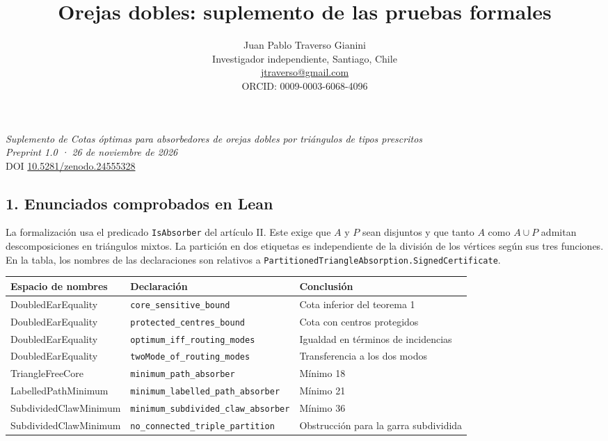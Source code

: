 \documentclass[spanish,11pt,a4paper]{article}
\title{Orejas dobles: suplemento de las pruebas formales}
\author{Juan Pablo Traverso Gianini\\
\small Investigador independiente, Santiago, Chile\\
\small \href{mailto:jtraverso@gmail.com}{jtraverso@gmail.com}\\
\small ORCID: 0009-0003-6068-4096}
\date{}
\newcounter{none}
\begin{document}
\raggedbottom
\maketitle
\emph{Suplemento de Cotas óptimas para absorbedores de orejas dobles por triángulos de tipos prescritos}\\
\emph{Preprint 1.0 · 26 de noviembre de 2026}\\
DOI \href{https://doi.org/10.5281/zenodo.24555328}{10.5281/zenodo.24555328}

\subsection{1. Enunciados comprobados en Lean}\label{enunciados-comprobados-en-lean}

La formalización usa el predicado \texttt{IsAbsorber} del artículo II. Este exige que \(A\) y \(P\) sean disjuntos y que tanto \(A\) como \(A\cup P\) admitan descomposiciones en triángulos mixtos. La partición en dos etiquetas es independiente de la división de los vértices según sus tres funciones. En la tabla, los nombres de las declaraciones son relativos a \texttt{PartitionedTriangleAbsorption.SignedCertificate}.

{\def\LTcaptype{none} %
\begin{longtable}[]{@{}
  >{\raggedright\arraybackslash}p{}
  >{\raggedright\arraybackslash}p{}
  >{\raggedright\arraybackslash}p{}@{}}
\toprule\noalign{}
\begin{minipage}[b]{\linewidth}\raggedright
Espacio de nombres
\end{minipage} & \begin{minipage}[b]{\linewidth}\raggedright
Declaración
\end{minipage} & \begin{minipage}[b]{\linewidth}\raggedright
Conclusión
\end{minipage} \\
\midrule\noalign{}
\endhead
\bottomrule\noalign{}
\endlastfoot
DoubledEarEquality & \texttt{core\_sensitive\_bound} & Cota inferior del teorema 1 \\
DoubledEarEquality & \texttt{protected\_centres\_bound} & Cota con centros protegidos \\
DoubledEarEquality & \texttt{optimum\_iff\_routing\_modes} & Igualdad en términos de incidencias \\
DoubledEarEquality & \texttt{twoMode\_of\_routing\_modes} & Transferencia a los dos modos \\
TriangleFreeCore & \texttt{minimum\_path\_absorber} & Mínimo 18 \\
LabelledPathMinimum & \texttt{minimum\_labelled\_path\_absorber} & Mínimo 21 \\
SubdividedClawMinimum & \texttt{minimum\_subdivided\_claw\_absorber} & Mínimo 36 \\
SubdividedClawMinimum & \texttt{no\_connected\_triple\_partition} & Obstrucción para la garra subdividida \\
\end{longtable}
}
\end{document}

